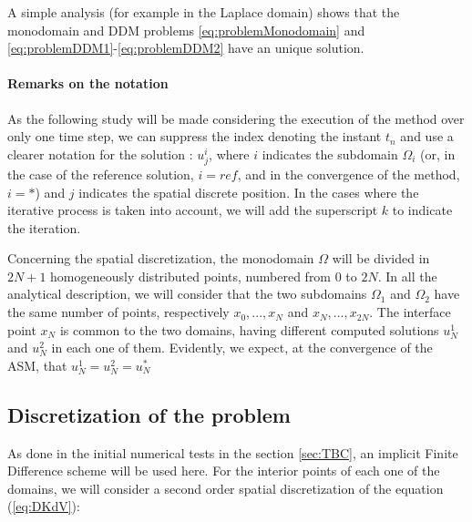 \indent A simple analysis (for example in the Laplace domain) shows that the monodomain and DDM problems \eqref{eq:problemMonodomain} and \eqref{eq:problemDDM1}-\eqref{eq:problemDDM2} have an unique solution.

\paragraph{Remarks on the notation}


\indent As the following study will be made considering the execution of the method over only one time step, we can suppress the index denoting the instant $t_n$ and use a clearer notation for the solution : $u_j^i$, where $i$ indicates the subdomain $\Omega_i$ (or, in the case of the reference solution, $i = ref$, and in the convergence of the method, $i = *$) and $j$ indicates the spatial discrete position. In the cases where the iterative process is taken into account, we will add the superscript $k$ to indicate the iteration.

\indent Concerning the spatial discretization, the monodomain $\Omega$ will be divided in $2N + 1$ homogeneously distributed points, numbered from $0$ to $2N$. In all the analytical description, we will consider that the two subdomains $\Omega_1$ and $\Omega_2$ have the same number of points, respectively $x_0,...,x_N$ and $x_N,...,x_{2N}$. The interface point $x_N$ is common to the two domains, having different computed solutions $u_N^1$ and $u_N^2$ in each one of them. Evidently, we expect, at the convergence of the ASM, that $u_N^1 = u_N^2 = u_N^*$

\subsection{Discretization of the problem}

\indent As done in the initial numerical tests in the section \ref{sec:TBC}, an implicit Finite Difference scheme will be used here. For the interior points of each one of the domains, we will consider a second order spatial discretization of the equation (\ref{eq:DKdV}):

